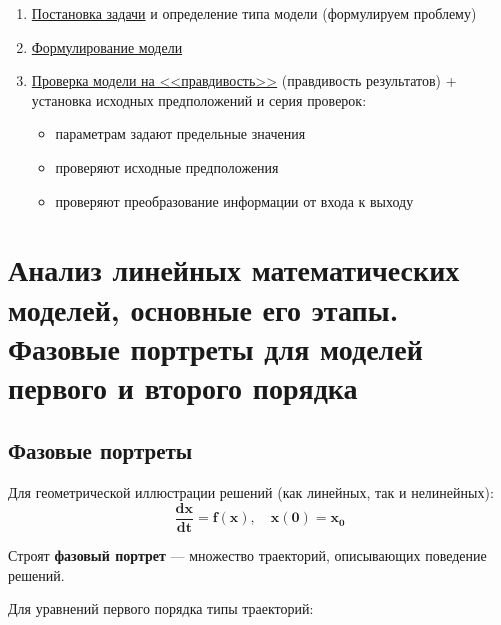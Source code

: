 	\begin{enumerate}
		\item \uline{Постановка задачи} и определение типа модели (формулируем проблему)
		\item \uline{Формулирование модели}
		\item \uline{Проверка модели на <<правдивость>>} (правдивость результатов) + установка исходных предположений и серия проверок:
		\begin{itemize}
			\item параметрам задают предельные значения
			\item проверяют исходные предположения
			\item проверяют преобразование информации от входа к выходу
		\end{itemize}
	\end{enumerate}
	
	\newpage
	
	\section{Анализ линейных математических моделей, основные его этапы. Фазовые портреты для моделей первого и второго порядка}
	
	\subsection{Фазовые портреты}
	
	Для геометрической иллюстрации решений (как линейных, так и нелинейных):
	\begin{equation}
		\mathbf{\frac{dx}{dt} = f(x), \quad x(0) = x_0}
	\end{equation}
	
	Строят \textbf{фазовый портрет} — множество траекторий, описывающих поведение решений.
	\par
	\vspace{0.5em}
	Для уравнений первого порядка типы траекторий:
	{\setcounter{ruscount}{0} %
	}
	

